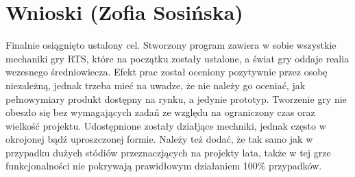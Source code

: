 \section{Wnioski (Zofia Sosińska)}
Finalnie osiągnięto ustalony cel. Stworzony program zawiera w sobie wszystkie mechaniki gry RTS,
które na początku zostały ustalone, a świat gry oddaje realia wczesnego średniowiecza. 
Efekt prac został oceniony pozytywnie przez osobę niezależną, jednak trzeba mieć na uwadze, 
że nie należy go oceniać, jak pełnowymiary produkt dostępny na rynku, a jedynie prototyp.
Tworzenie gry nie obeszło się bez wymagających zadań ze względu na ograniczony czas oraz wielkość 
projektu. Udostępnione zostały działjące mechniki, jednak często w okrojonej bądź uproszczonej formie.
Należy też dodać, że tak samo jak w przypadku dużych stódiów przeznaczjących na projekty lata, także 
w tej grze funkcjonalności nie pokrywają prawidłowym działaniem 100\% przypadków.